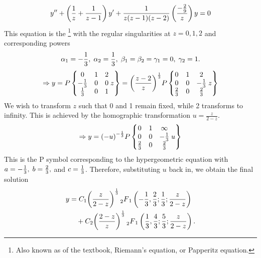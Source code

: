 \item

\[
    y'' + \left( \frac{1}{z} + \frac{1}{z - 1} \right) y'
    + \frac{1}{z (z - 1) (z - 2)} \left( \frac{-\frac{2}{9}}{z} \right) y
    = 0
\]
This equation is the \footnote{%
Also known as  of the textbook, Riemann's equation, or Papperitz equation.}
with the regular singularities at $z = 0, 1, 2$ and corresponding powers
\[
    \alpha_1 = -\frac{1}{3},\; \alpha_2 = \frac{1}{3},\;
    \beta_1 = \beta_2 = \gamma_1 = 0,\; \gamma_2 = 1.
\]
\[
    \Rightarrow y
    = P\left\{
        \begin{matrix} 0 & 1 & 2 \\ -\frac{1}{3} & 0 & 0 \\ \frac{1}{3} & 0 & 1 \end{matrix}
    \; z\right\}
    = {\left( \frac{z - 2}{z} \right)}^{\frac{1}{3}} P\left\{
        \begin{matrix} 0 & 1 & 2 \\ 0 & 0 & -\frac{1}{3} \\ \frac{2}{3} & 0 & \frac{2}{3} \end{matrix}
    \; z\right\}
\]
We wish to transform $z$ such that 0 and 1 remain fixed, while 2 transforms to infinity.
This is achieved by the homographic transformation $u = \frac{z}{2 - z}$.
\[
    \Rightarrow y
    = {(-u)}^{-\frac{1}{3}} P\left\{
        \begin{matrix} 0 & 1 & \infty \\ 0 & 0 & -\frac{1}{3} \\ \frac{2}{3} & 0 & \frac{2}{3} \end{matrix}
    \; u\right\}
\]
This is the P symbol corresponding to the hypergeometric equation
with $a = -\frac{1}{3},\; b = \frac{2}{3},$ and $c = \frac{1}{3}$.
Therefore, substituting $u$ back in, we obtain the final solution
\begin{align*}
    y
    &= C_1 {\left( \frac{z}{2 - z} \right)}^{\frac{1}{3}} \prescript{}{2}{F}_{1} \left(
        -\frac{1}{3}, \frac{2}{3}; \frac{1}{3}; \frac{z}{2 - z}
    \right) \\
    &\quad + C_2 {\left( \frac{2 - z}{z} \right)}^{\frac{1}{3}} \prescript{}{2}{F}_{1} \left(
        \frac{1}{3}, \frac{4}{3}; \frac{5}{3}; \frac{z}{2 - z}
    \right).
\end{align*}
